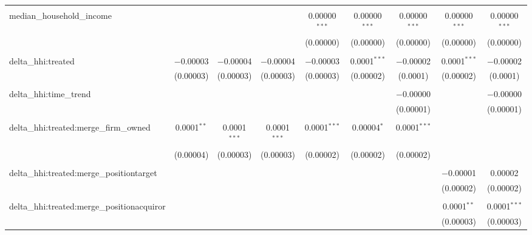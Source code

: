 \begin{table}[H]
{\begin{tabular}{@{\extracolsep{5pt}}lcccccccc}
   & & & & & & & & \\  

  median\_household\_income &  &  &  & 0.00000$^{***}$ & 0.00000$^{***}$ & 0.00000$^{***}$ & 0.00000$^{***}$ & 0.00000$^{***}$ \\  

   &  &  &  & (0.00000) & (0.00000) & (0.00000) & (0.00000) & (0.00000) \\  

   & & & & & & & & \\  

  delta\_hhi:treated & $-$0.00003 & $-$0.00004 & $-$0.00004 & $-$0.00003 & 0.0001$^{***}$ & $-$0.00002 & 0.0001$^{***}$ & $-$0.00002 \\  

   & (0.00003) & (0.00003) & (0.00003) & (0.00003) & (0.00002) & (0.0001) & (0.00002) & (0.0001) \\  

   & & & & & & & & \\  

  delta\_hhi:time\_trend &  &  &  &  &  & $-$0.00000 &  & $-$0.00000 \\  

   &  &  &  &  &  & (0.00001) &  & (0.00001) \\  

   & & & & & & & & \\  

  delta\_hhi:treated:merge\_firm\_owned & 0.0001$^{**}$ & 0.0001$^{***}$ & 0.0001$^{***}$ & 0.0001$^{***}$ & 0.00004$^{*}$ & 0.0001$^{***}$ &  &  \\  

   & (0.00004) & (0.00003) & (0.00003) & (0.00002) & (0.00002) & (0.00002) &  &  \\  

   & & & & & & & & \\  

  delta\_hhi:treated:merge\_positiontarget &  &  &  &  &  &  & $-$0.00001 & 0.00002 \\  

   &  &  &  &  &  &  & (0.00002) & (0.00002) \\  

   & & & & & & & & \\  

  delta\_hhi:treated:merge\_positionacquiror &  &  &  &  &  &  & 0.0001$^{**}$ & 0.0001$^{***}$ \\  

   &  &  &  &  &  &  & (0.00003) & (0.00003) \\  


\end{tabular}}
\end{table}
